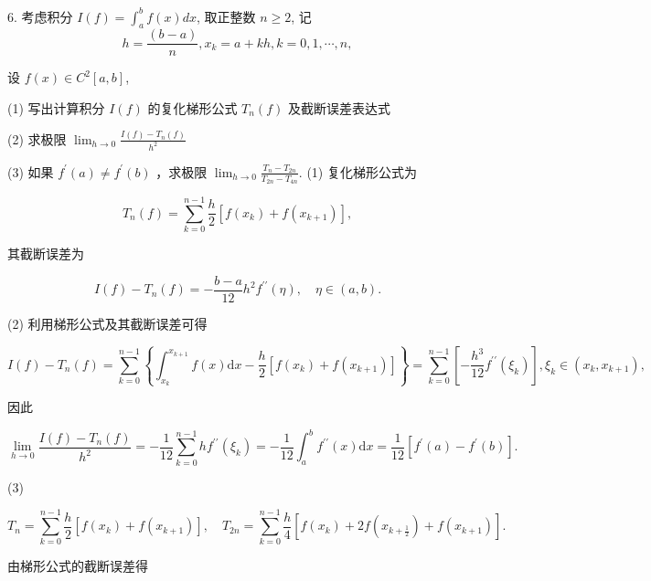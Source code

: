 \begin{tcolorbox}[enhanced,colback=10,colframe=9,breakable,coltitle=green!25!black,title=2024]

6. 考虑积分 $ I(f)=\displaystyle\int_{a}^{b} f(x) d x $, 取正整数 $ n \geq 2 $, 记
$$
h=\frac{(b-a)}{n}, x_{k}=a+k h, k=0,1, \cdots, n,
$$

设 $ f(x) \in C^{2}[a, b] $,

(1) 写出计算积分 $ I(f) $ 的复化梯形公式 $ T_{n}(f) $ 及截断误差表达式

(2) 求极限 $\displaystyle \lim _{h \rightarrow 0} \frac{I(f)-T_{n}(f)}{h^{2}} $

(3) 如果 $ f^{\prime}(a) \neq f^{\prime}(b) $ ，求极限 $\displaystyle \lim _{h \rightarrow 0} \frac{T_{n}-T_{2 n}}{T_{2 n}-T_{4 n}} $.
\tcblower
 (1) 复化梯形公式为

$$T_{n}(f) = \mathop{{\sum}}\limits_{k = 0}^{n {-} 1}\frac{h}{2}\left\lbrack f\left( x_{k} \right) + f\left( x_{k + 1} \right) \right\rbrack,$$

其截断误差为

$$I(f) {-} T_{n}(f) = {-} \frac{b {-} a}{12}h^{2}f^{{\prime}{\prime}}(\eta),\quad\eta {\in} (a,b).$$

(2) 利用梯形公式及其截断误差可得

$$I(f) {-} T_{n}(f) = \mathop{{\sum}}\limits_{k = 0}^{n {-} 1}\left\{{\int}_{x_{k}}^{x_{k + 1}}f(x)\mathrm{d}x {-} \frac{h}{2}\left\lbrack f\left( x_{k} \right) + f\left( x_{k + 1} \right) \right\rbrack \right\} = \mathop{{\sum}}\limits_{k = 0}^{n {-} 1}\left\lbrack {-}\frac{h^{3}}{12}f^{{\prime}{\prime}}\left( {\xi}_{k} \right) \right\rbrack,{\xi}_{k} {\in} \left( x_{k},x_{k + 1} \right),$$

因此

$$\mathop{\lim}\limits_{h {\rightarrow} 0}\frac{I(f) {-} T_{n}(f)}{h^{2}} = {-} \frac{1}{12}\mathop{{\sum}}\limits_{k = 0}^{n {-} 1}hf^{{\prime}{\prime}}\left( {\xi}_{k} \right) =-\frac{1}{12}\int_{a}^{b}f^{{\prime}{\prime}}(x)\mathrm{d}x = \frac{1}{12}\left\lbrack f^{{\prime}}(a) {-} f^{{\prime}}(b) \right\rbrack.$$

(3) 

$$T_{n} = \mathop{{\sum}}\limits_{k = 0}^{n {-} 1}\frac{h}{2}\left\lbrack f\left( x_{k} \right) + f\left( x_{k + 1} \right) \right\rbrack, \quad T_{2n} = \mathop{{\sum}}\limits_{k = 0}^{n {-} 1}\frac{h}{4}\left\lbrack f\left( x_{k} \right) + 2f\left( x_{k + \frac{1}{2}} \right) + f\left( x_{k + 1} \right) \right\rbrack.$$

 由梯形公式的截断误差得


\end{tcolorbox}
